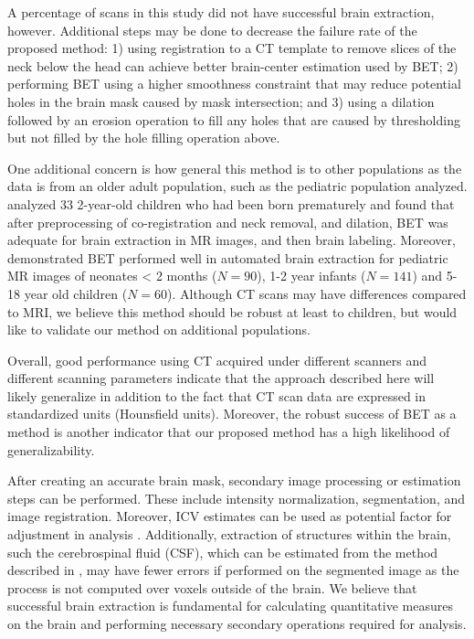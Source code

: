 A percentage of scans in this study did not have successful brain extraction, however.  Additional steps may be done to decrease the failure rate of the proposed method: 1) using registration to a CT template \citep{rorden_age-specific_2012} to remove slices of the neck below the head can achieve better brain-center estimation used by BET; 2) performing BET using a higher smoothness constraint that may reduce potential holes in the brain mask caused by mask intersection; and 3) using a dilation followed by an erosion operation to fill any holes that are caused by thresholding but not filled by the hole filling operation above.  


One additional concern is how general this method is to other populations as the data is from an older adult population, such as the pediatric population \citep{mandell2014volumetric2} analyzed.   \citet{gousias2008automatic} analyzed 33 2-year-old children who had been born prematurely and found that after preprocessing of co-registration and neck removal, and dilation, BET was adequate for brain extraction in MR images, and then brain labeling.  Moreover, \citet{shi2012label} demonstrated BET performed well in automated brain extraction for pediatric MR images of neonates < 2 months ($N = 90$), 1-2 year infants ($N = 141$) and 5-18 year old children ($N = 60$).  Although CT scans may have differences compared to MRI, we believe this method should be robust at least to children, but would like to validate our method on additional populations.  

Overall, good performance using CT acquired under different scanners and different scanning parameters indicate that the approach described here will likely generalize in addition to the fact that CT scan data are expressed in standardized units (Hounsfield units).  Moreover, the robust success of BET as a method is another indicator that our proposed method has a high likelihood of generalizability.


After creating an accurate brain mask, secondary image processing or estimation steps can be performed.  These include intensity normalization, segmentation, and image registration.  Moreover, ICV estimates can be used as potential factor for adjustment in analysis \citep{whitwell2001normalization}.  Additionally, extraction of structures within the brain, such the cerebrospinal fluid (CSF), which can be estimated from the method described in \citet{volkau2010ventricle}, may have fewer errors if performed on the segmented image as the process is not computed over voxels outside of the brain.  We believe that successful brain extraction is fundamental for calculating quantitative measures on the brain and performing necessary secondary operations required for analysis.

